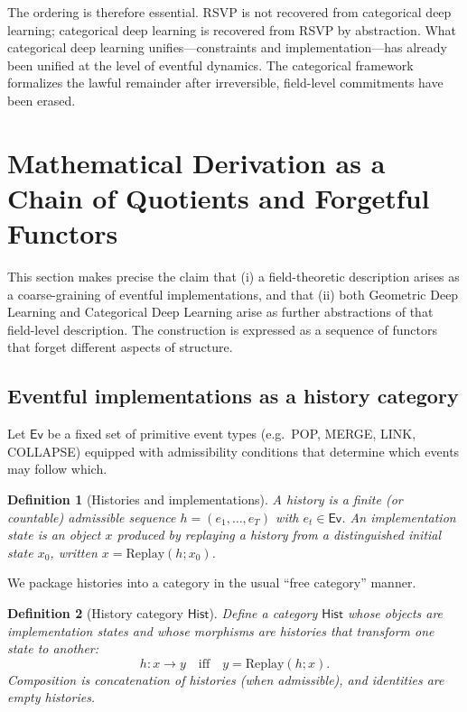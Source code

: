 \documentclass[11pt]{article}
\newtheorem{definition}{Definition}
\begin{document}
The ordering is therefore essential. RSVP is not recovered from categorical deep
learning; categorical deep learning is recovered from RSVP by abstraction. What
categorical deep learning unifies—constraints and implementation—has already
been unified at the level of eventful dynamics. The categorical framework
formalizes the lawful remainder after irreversible, field-level commitments have
been erased.

\section{Mathematical Derivation as a Chain of Quotients and Forgetful Functors}

This section makes precise the claim that (i) a field-theoretic description
arises as a coarse-graining of eventful implementations, and that (ii) both
Geometric Deep Learning and Categorical Deep Learning arise as further
abstractions of that field-level description. The construction is expressed as a
sequence of functors that forget different aspects of structure.

\subsection{Eventful implementations as a history category}

Let $\mathsf{Ev}$ be a fixed set of primitive event types (e.g.\ POP, MERGE, LINK,
COLLAPSE) equipped with admissibility conditions that determine which events may
follow which.

\begin{definition}[Histories and implementations]
A \emph{history} is a finite (or countable) admissible sequence
$h = (e_1,\dots,e_T)$ with $e_t \in \mathsf{Ev}$.
An \emph{implementation state} is an object $x$ produced by replaying a history
from a distinguished initial state $x_0$, written $x = \mathrm{Replay}(h;x_0)$.
\end{definition}

We package histories into a category in the usual ``free category'' manner.

\begin{definition}[History category $\mathsf{Hist}$]
Define a category $\mathsf{Hist}$ whose objects are implementation states and
whose morphisms are histories that transform one state to another:
\[
h : x \to y
\quad \text{iff} \quad
y = \mathrm{Replay}(h;x).
\]
Composition is concatenation of histories (when admissible), and identities are
empty histories.
\end{definition}
\end{document}
